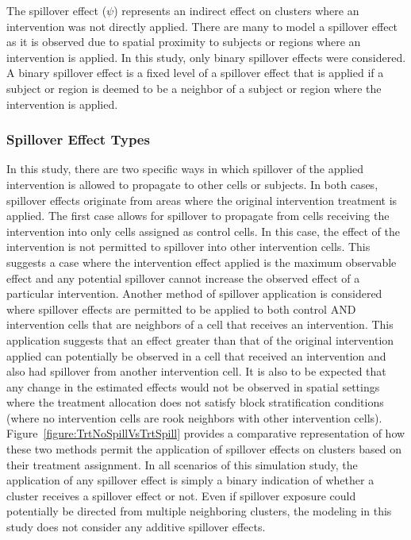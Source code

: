 \documentclass{article}[11pt]
\begin{document}
The spillover effect ($\psi$) represents an indirect effect on clusters where an intervention was not directly applied\cite{benjamin-chung_spillover_2017}\cite{benjamin-chung_extension_2024}. There are many to model a spillover effect as it is observed due to spatial proximity to subjects or regions where an intervention is applied. In this study, only binary spillover effects were considered. A binary spillover effect is a fixed level of a spillover effect that is applied if a subject or region is deemed to be a neighbor of a subject or region where the intervention is applied. 

\subsubsection{Spillover Effect Types}\label{section:SpilloverEffectTypes}

In this study, there are two specific ways in which spillover of the applied intervention is allowed to propagate to other cells or subjects. In both cases, spillover effects originate from areas where the original intervention treatment is applied. The first case allows for spillover to propagate from cells receiving the intervention into only cells assigned as control cells. In this case, the effect of the intervention is not permitted to spillover into other intervention cells. This suggests a case where the intervention effect applied is the maximum observable effect and any potential spillover cannot increase the observed effect of a particular intervention. Another method of spillover application is considered where spillover effects are permitted to be applied to both control AND intervention cells that are neighbors of a cell that receives an intervention. This application suggests that an effect greater than that of the original intervention applied can potentially be observed in a cell that received an intervention and also had spillover from another intervention cell. It is also to be expected that any change in the estimated effects would not be observed in spatial settings where the treatment allocation does not satisfy block stratification conditions (where no intervention cells are rook neighbors with other intervention cells). Figure~\ref{figure:TrtNoSpillVsTrtSpill} provides a comparative representation of how these two methods permit the application of spillover effects on clusters based on their treatment assignment. In all scenarios of this simulation study, the application of any spillover effect is simply a binary indication of whether a cluster receives a spillover effect or not. Even if spillover exposure could potentially be directed from multiple neighboring clusters, the modeling in this study does not consider any additive spillover effects.
\end{document}
